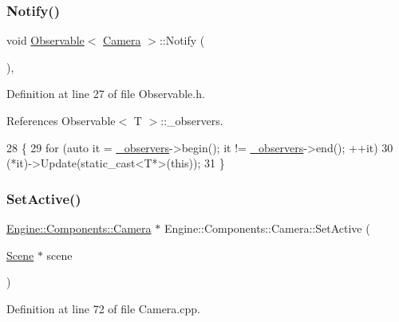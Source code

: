 \subsubsection{\texorpdfstring{Notify()}{Notify()}}
{\footnotesize\ttfamily void \mbox{\hyperlink{classObservable}{Observable}}$<$ \mbox{\hyperlink{classEngine_1_1Components_1_1Camera}{Camera}}  $>$\+::Notify (\begin{DoxyParamCaption}{ }\end{DoxyParamCaption})\hspace{0.3cm}{\ttfamily [inline]}, {\ttfamily [inherited]}}



Definition at line 27 of file Observable.\+h.



References Observable$<$ T $>$\+::\+\_\+observers.


\begin{DoxyCode}
28     \{
29         \textcolor{keywordflow}{for} (\textcolor{keyword}{auto} it = \mbox{\hyperlink{classObservable_ae6028589035c86e8a9c4375306dca702}{\_observers}}->begin(); it != \mbox{\hyperlink{classObservable_ae6028589035c86e8a9c4375306dca702}{\_observers}}->end(); ++it)
30             (*it)->Update(static\_cast<T*>(\textcolor{keyword}{this}));
31     \}
\end{DoxyCode}
\mbox{\label{classEngine_1_1Components_1_1Camera_af3ce56d4d1a66fa4e45ec8775e4149e7}} 
\subsubsection{\texorpdfstring{Set\+Active()}{SetActive()}}
{\footnotesize\ttfamily \mbox{\hyperlink{classEngine_1_1Components_1_1Camera}{Engine\+::\+Components\+::\+Camera}} $\ast$ Engine\+::\+Components\+::\+Camera\+::\+Set\+Active (\begin{DoxyParamCaption}\item[{\mbox{\hyperlink{classEngine_1_1Components_1_1Scene}{Scene}} $\ast$}]{scene }\end{DoxyParamCaption})}



Definition at line 72 of file Camera.\+cpp.



